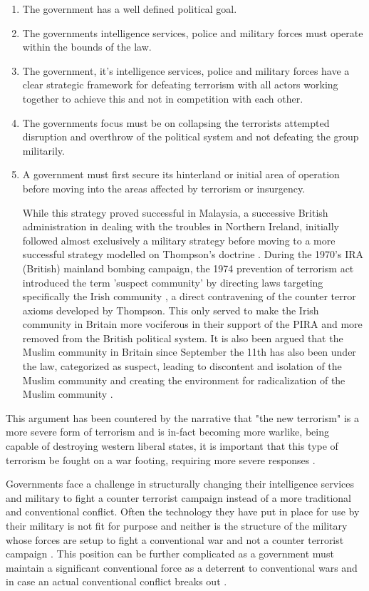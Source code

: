 \begin{enumerate}
\item The government has a well defined political goal.
\item The governments intelligence services, police and military forces must operate within the bounds of the law.
\item The government, it's intelligence services, police and military forces have a clear strategic framework for defeating terrorism with all actors working together to achieve this and not in competition with each other.
\item The governments focus must be on collapsing the terrorists attempted disruption and overthrow of the political system and not defeating the group militarily.
\item A government must first secure its hinterland or initial area of operation before moving into the areas affected by terrorism or insurgency.

While this strategy proved successful in Malaysia, a successive British administration in dealing with the troubles in Northern Ireland, initially followed almost exclusively a military strategy before moving to a more successful strategy modelled on Thompson's doctrine \citep{lafree2009impact}. During the 1970's IRA (British) mainland bombing campaign, the 1974 prevention of terrorism act introduced the term 'suspect community' by directing  laws targeting specifically the Irish community \citep{hillyard1993suspect}, a direct contravening of the counter terror axioms developed by Thompson. This only served to make the Irish community in Britain more vociferous in their support of the PIRA and more removed from the British political system. It is also been argued that the Muslim community in Britain since September the 11th has also been under the law, categorized as suspect, leading to discontent and isolation of the Muslim community and creating the environment for radicalization of the Muslim community \citep{pantazis2009old}.
\end{enumerate}
This argument has been countered by the narrative that "the new terrorism" is a more severe form of terrorism and is in-fact becoming more warlike, being capable of destroying western liberal states, it is important that this type of terrorism be fought on a war footing, requiring more severe responses \citep{bobbitt2008terror}.

Governments face a challenge in structurally changing their intelligence services and military to fight a counter terrorist campaign instead of a more traditional and conventional conflict. Often the technology they have put in place for use by their military is not fit for purpose and neither is the structure of the military whose forces are setup to fight a conventional war and not a counter terrorist campaign \citep{gazette1989changing}. This position can be further complicated as a government must maintain a significant conventional force as a deterrent to conventional wars and in case an actual conventional conflict breaks out \citep{gates2009balanced}.

